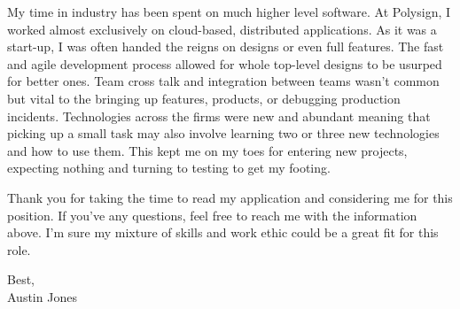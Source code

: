 \documentclass[a4paper,12pt]{article}
\begin{document}
My time in industry has been spent on much higher level software.
At Polysign, I worked almost exclusively on cloud-based, distributed applications.
As it was a start-up, I was often handed the reigns on designs or even full features.
The fast and agile development process allowed for whole top-level designs to be usurped for better ones.
Team cross talk and integration between teams wasn't common but vital to the bringing up features, products, or debugging production incidents.
Technologies across the firms were new and abundant meaning that picking up a small task may also involve learning two or three new technologies and how to use them.
This kept me on my toes for entering new projects, expecting nothing and turning to testing to get my footing.

Thank you for taking the time to read my application and considering me for this position.
If you've any questions, feel free to reach me with the information above.
I'm sure my mixture of skills and work ethic could be a great fit for this role.

Best, \\
Austin Jones
\end{document}
